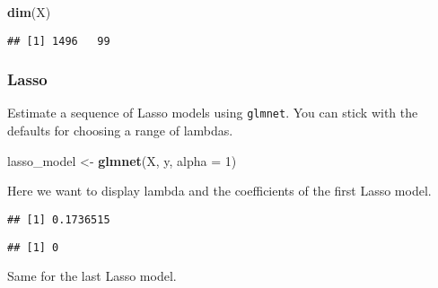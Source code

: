 \documentclass[
]{article}
\newenvironment{Shaded}{\begin{snugshade}}{\end{snugshade}}
\newcommand{\AttributeTok}[1]{\textcolor[rgb]{0.13,0.29,0.53}{#1}}
\newcommand{\DecValTok}[1]{\textcolor[rgb]{0.00,0.00,0.81}{#1}}
\newcommand{\FunctionTok}[1]{\textcolor[rgb]{0.13,0.29,0.53}{\textbf{#1}}}
\newcommand{\NormalTok}[1]{#1}
\newcommand{\OtherTok}[1]{\textcolor[rgb]{0.56,0.35,0.01}{#1}}
\newcommand{\SpecialCharTok}[1]{\textcolor[rgb]{0.81,0.36,0.00}{\textbf{#1}}}
\begin{document}
\begin{Shaded}
\begin{Highlighting}[]
\FunctionTok{dim}\NormalTok{(X)}
\end{Highlighting}
\end{Shaded}

\begin{verbatim}
## [1] 1496   99
\end{verbatim}

\hypertarget{lasso}{%
\subsubsection{Lasso}\label{lasso}}

Estimate a sequence of Lasso models using \texttt{glmnet}. You can stick
with the defaults for choosing a range of lambdas.

\begin{Shaded}
\begin{Highlighting}[]
\NormalTok{lasso\_model }\OtherTok{\textless{}{-}} \FunctionTok{glmnet}\NormalTok{(X, y, }\AttributeTok{alpha =} \DecValTok{1}\NormalTok{)}
\end{Highlighting}
\end{Shaded}

Here we want to display lambda and the coefficients of the first Lasso
model.

\begin{Shaded}
\end{Shaded}

\begin{verbatim}
## [1] 0.1736515
\end{verbatim}

\begin{Shaded}
\end{Shaded}

\begin{verbatim}
## [1] 0
\end{verbatim}

Same for the last Lasso model.

\begin{Shaded}
\end{Shaded}
\end{document}
